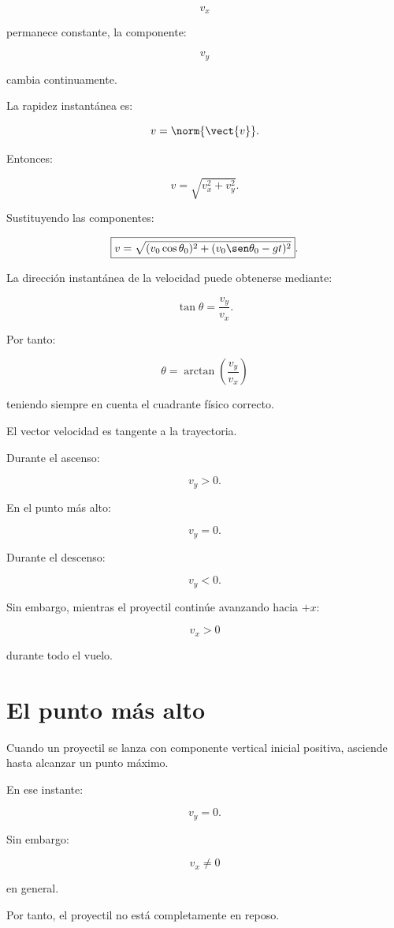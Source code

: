 \[
v_x
\]

permanece constante, la componente:

\[
v_y
\]

cambia continuamente.

La rapidez instantánea es:

\[
v
=
\norm{\vect{v}}.
\]

Entonces:

\[
\boxed{
v
=
\sqrt{v_x^2+v_y^2}
}.
\]

Sustituyendo las componentes:

\[
\boxed{
v
=
\sqrt{
(v_0\cos\theta_0)^2
+
(v_0\sen\theta_0-gt)^2
}
}.
\]

La dirección instantánea de la velocidad puede obtenerse mediante:

\[
\tan\theta
=
\frac{v_y}{v_x}.
\]

Por tanto:

\[
\boxed{
\theta
=
\arctan
\left(
\frac{v_y}{v_x}
\right)
}
\]

teniendo siempre en cuenta el cuadrante físico correcto.

\begin{interpretacion}
El vector velocidad es tangente a la trayectoria.

Durante el ascenso:

\[
v_y>0.
\]

En el punto más alto:

\[
v_y=0.
\]

Durante el descenso:

\[
v_y<0.
\]

Sin embargo, mientras el proyectil continúe avanzando hacia \(+x\):

\[
v_x>0
\]

durante todo el vuelo.
\end{interpretacion}


\section{El punto más alto}

Cuando un proyectil se lanza con componente vertical inicial positiva, asciende
hasta alcanzar un punto máximo.

En ese instante:

\[
\boxed{v_y=0}.
\]

Sin embargo:

\[
v_x\neq0
\]

en general.

Por tanto, el proyectil no está completamente en reposo.

